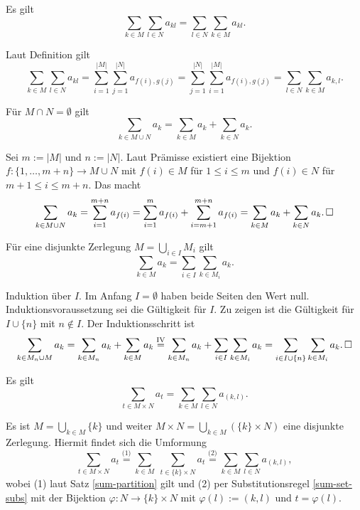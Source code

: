 \begin{Satz} Es gilt
\[\sum_{k\in M}\sum_{l\in N} a_{kl} = \sum_{l\in N}\sum_{k\in M} a_{kl}.\]
\end{Satz}
\begin{Beweis}
Laut Definition gilt
\[\sum_{k\in M}\sum_{l\in N} a_{kl}
= \sum_{i=1}^{|M|}\sum_{j=1}^{|N|} a_{f(i),g(j)}
= \sum_{j=1}^{|N|}\sum_{i=1}^{|M|} a_{f(i),g(j)}
= \sum_{l\in N}\sum_{k\in M} a_{k,l}.\]
\end{Beweis}

\begin{Satz}\label{sum-set-disjoint}
Für $M\cap N=\emptyset$ gilt
\[\sum_{k\in M\cup N} a_k = \sum_{k\in M} a_k + \sum_{k\in N} a_k.\]
\end{Satz}
\begin{Beweis}
Sei $m:=|M|$ und $n:=|N|$. Laut Prämisse existiert eine Bijektion
$f\colon \{1,\ldots, m+n\}\to M\cup N$ mit $f(i)\in M$ für
$1\le i\le m$ und $f(i)\in N$ für $m+1\le i\le m+n$. Das macht
\[\sum_{k\in M\cup N} a_k = \sum_{i=1}^{m+n} a_{f(i)}
= \sum_{i=1}^m a_{f(i)} + \sum_{i=m+1}^{m+n} a_{f(i)}
= \sum_{k\in M} a_k + \sum_{k\in N} a_k.\,\square\]
\end{Beweis}

\begin{Satz}\label{sum-partition}
Für eine disjunkte Zerlegung $M = \bigcup_{i\in I} M_i$ gilt
\[\sum_{k\in M} a_k = \sum_{i\in I}\sum_{k\in M_i} a_k.\]
\end{Satz}
\begin{Beweis}
Induktion über $I$. Im Anfang $I=\emptyset$ haben beide Seiten
den Wert null. Induktionsvoraussetzung sei die Gültigkeit
für $I$. Zu zeigen ist die Gültigkeit für $I\cup\{n\}$ mit $n\notin I$.
Der Induktionsschritt ist
\[\sum_{k\in M_n\cup M} a_k
= \sum_{k\in M_n} a_k + \sum_{k\in M} a_k
\stackrel{\mathrm{IV}}= \sum_{k\in M_n} a_k +
\sum_{i\in I}\sum_{k\in M_i} a_k
= \sum_{i\in I\cup\{n\}}\sum_{k\in M_i} a_k.\,\square\]
\end{Beweis}

\begin{Satz}
Es gilt
\[\sum_{t\in M\times N} a_t = \sum_{k\in M}\sum_{l\in N} a_{(k,l)}.\]
\end{Satz}
\begin{Beweis}
Es ist $M = \bigcup_{k\in M} \{k\}$ und weiter $M\times N =
\bigcup_{k\in M} (\{k\}\times N)$ eine disjunkte Zerlegung. Hiermit
findet sich die Umformung
\[\sum_{t\in M\times N} a_t
\stackrel{\text{(1)}}= \sum_{k\in M}\;\sum_{t\in \{k\}\times N} a_t
\stackrel{\text{(2)}}= \sum_{k\in M}\sum_{l\in N} a_{(k,l)},\]
wobei (1) laut Satz \ref{sum-partition} gilt und (2) per Substitutionsregel
\ref{sum-set-subs} mit der Bijektion $\varphi\colon N\to\{k\}\times N$
mit $\varphi(l):=(k,l)$ und $t=\varphi(l)$.
\end{Beweis}

